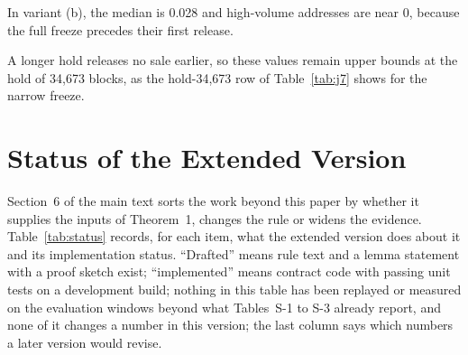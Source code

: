 \documentclass[10pt,a4paper]{article}
\theoremstyle{plain}
\theoremstyle{remark}
\begin{document}
In variant (b), the median is 0.028 and high-volume addresses are near 0, because the full freeze precedes their first release.


A longer hold releases no sale earlier, so these values remain upper bounds at the hold of 34,673 blocks, as the hold-34,673 row of Table~\ref{tab:j7} shows for the narrow freeze.


\section{Status of the Extended Version}
\label{sec:status}

Section~6 of the main text sorts the work beyond this paper by whether it supplies the inputs of Theorem~1, changes the rule or widens the evidence. Table~\ref{tab:status} records, for each item, what the extended version does about it and its implementation status. ``Drafted'' means rule text and a lemma statement with a proof sketch exist; ``implemented'' means contract code with passing unit tests on a development build; nothing in this table has been replayed or measured on the evaluation windows beyond what Tables~S-1 to S-3 already report, and none of it changes a number in this version; the last column says which numbers a later version would revise.
\end{document}
